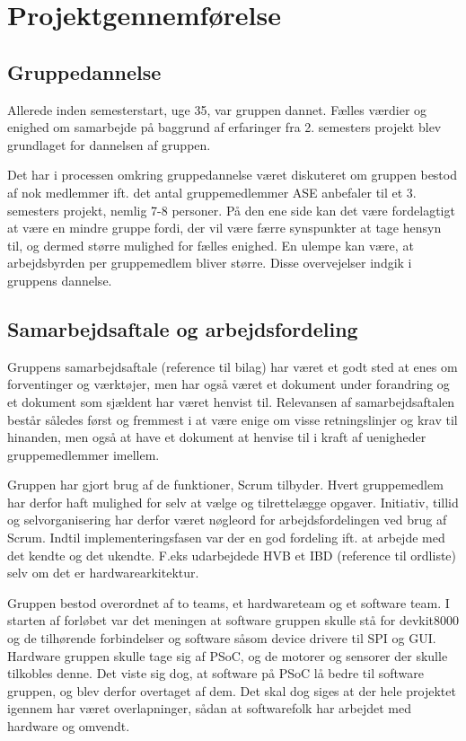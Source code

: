 ﻿\chapter*{Projektgennemførelse}
\section*{Gruppedannelse}
Allerede inden semesterstart, uge 35, var gruppen dannet. Fælles værdier og enighed om samarbejde på baggrund af erfaringer fra 2. semesters projekt
blev grundlaget for dannelsen af gruppen.

Det har i processen omkring gruppedannelse været diskuteret om gruppen bestod af nok medlemmer ift. det antal gruppemedlemmer ASE anbefaler til et 3. semesters
projekt, nemlig 7-8 personer. På den ene side kan det være fordelagtigt at være en mindre gruppe fordi, der vil være færre synspunkter at tage hensyn til,
og dermed større mulighed for fælles enighed. En ulempe kan være, at arbejdsbyrden per gruppemedlem bliver større. Disse overvejelser indgik i gruppens dannelse.\\

\section*{Samarbejdsaftale og arbejdsfordeling}
Gruppens samarbejdsaftale (reference til bilag) har været et godt sted at enes om forventinger og værktøjer, men har også været et dokument under forandring
og et dokument som sjældent har været henvist til. 
Relevansen af samarbejdsaftalen består således først og fremmest i at være enige om visse retningslinjer og krav til hinanden, men også at have et dokument
at henvise til i kraft af uenigheder gruppemedlemmer imellem.

Gruppen har gjort brug af de funktioner, Scrum tilbyder. Hvert gruppemedlem har derfor haft mulighed for selv at vælge og tilrettelægge opgaver. Initiativ,
tillid og selvorganisering har derfor været nøgleord for arbejdsfordelingen ved brug af Scrum.
Indtil implementeringsfasen var der en god fordeling ift. at arbejde med det kendte og det ukendte. F.eks udarbejdede HVB et IBD (reference til ordliste)
selv om det er hardwarearkitektur.

Gruppen bestod overordnet af to teams, et hardwareteam og et software team. I starten af forløbet var det meningen at software gruppen skulle stå for devkit8000
og de tilhørende forbindelser og software såsom device drivere til SPI og GUI. 
Hardware gruppen skulle tage sig af PSoC, og de motorer og sensorer der skulle tilkobles denne. Det viste sig dog, at software på PSoC lå bedre til software gruppen,
og blev derfor overtaget af dem. Det skal dog siges at der hele projektet igennem har været overlapninger, sådan at softwarefolk har arbejdet med hardware og omvendt.

